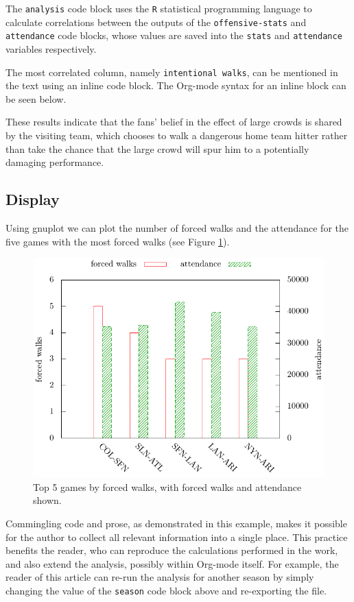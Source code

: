 \documentclass[11pt]{article}
\begin{document}
The \texttt{analysis} code block uses the \texttt{R} statistical programming
language to calculate correlations between the outputs of the
\texttt{offensive-stats} and \texttt{attendance} code blocks, whose values are saved
into the \texttt{stats} and \texttt{attendance} variables respectively.



The most correlated column, namely  \texttt{intentional walks}, can
be mentioned in the text using an inline code block.  The Org-mode
syntax for an inline block can be seen below.


These results indicate that the fans' belief in the effect of large
crowds is shared by the visiting team, which chooses to walk a
dangerous home team hitter rather than take the chance that the large
crowd will spur him to a potentially damaging performance.
\subsection{Display}
\label{sec-4_4}

Using gnuplot we can plot the number of forced walks and the
attendance for the five games with the most forced walks (see Figure
\ref{fig:top-5}).

\begin{figure}[htb]
\centering
\includegraphics{plot.pdf}
\caption{\label{fig:top-5}Top 5 games by forced walks, with forced walks and attendance shown.}
\end{figure}

Commingling code and prose, as demonstrated in this example, makes it
possible for the author to collect all relevant information into a
single place.  This practice benefits the reader, who can reproduce
the calculations performed in the work, and also extend the analysis,
possibly within Org-mode itself.  For example, the reader of this
article can re-run the analysis for another season by simply changing
the value of the \texttt{season} code block above and re-exporting the file.
\end{document}
